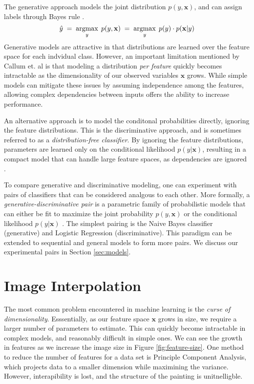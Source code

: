 \documentclass{article}
\DeclareMathOperator*{\argmax}{argmax}
\begin{document}
The generative approach models the joint distribution $p(y, \mathbf{x})$,
and can assign labels through Bayes rule \cite{NgJordan}.
\begin{equation}
    \hat{y} \; = \; \argmax_y \; p(y, \mathbf{x}) \; = \; \argmax_y \; p(y) \cdot p(\mathbf{x} | y) \\
\end{equation}
Generative models are attractive in that distributions are learned over the
feature space for each indvidual class. However, an important limitation
mentioned by Callum et. al \cite{McCallumCRF} is that modeling a distribution
\textit{per feature} quickly becomes intractable as the dimensionality of our
observed variables $\mathbf{x}$ grows. While simple models can mitigate
these issues by assuming independence among the features, allowing complex
dependencies between inputs offers the ability to increase performance.

An alternative approach is to model the conditonal probabilities directly,
ignoring the feature distributions. This is the discriminative approach,
and is sometimes referred to as a \textit{distribution-free classifier}.
By ignoring the feature distributions, parameters are learned only on the
conditional likelihood $p(y | \mathbf{x})$, resulting in a compact model
that can handle large feature spaces, as dependencies
are ignored \cite{McCallumCRF}.

To compare generative and discriminative modeling, one can experiment
with pairs of classifiers that can be considered analgous to each other.
More formally, a \textit{generative-discriminative pair} is a parametric
family of probabilistic models that can either be fit to maximize the joint
probability $p(y, \mathbf{x})$ or the conditional
likelihood $p(y | \mathbf{x})$ \cite{NgJordan}. The simplest pairing is
the Naive Bayes classifier (generative) and Logistic Regression
(discriminative). This paradigm can be extended to sequential and general
models to form more pairs. We discuss our experimental pairs
in Section \ref{sec:models}.




\section{Image Interpolation}
\label{sec:img-interpolation}
The most common problem encountered in machine learning is the
\textit{curse of dimensionality}. Esssentially, as our feature space
$\mathbf{x}$ grows in size, we require a larger number of parameters to
estimate. This can quickly become intractable in complex models, and
reasonably difficult in simple ones. We can see the growth
in features as we increase the image size in Figure \ref{fig:feature-size}.
One method to reduce the number of
features for a data set is Principle Component Analysis, which projects
data to a smaller dimension while maximining the variance. However,
interapibility is lost, and the structure of the painting is unitnelligble.
\end{document}
